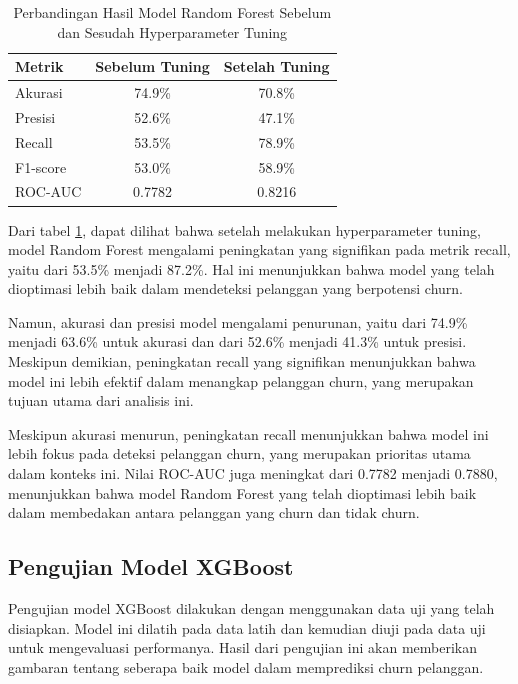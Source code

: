 \begin{table}[H]
    \centering
    \caption{Perbandingan Hasil Model Random Forest Sebelum dan Sesudah Hyperparameter Tuning}
    \label{tab:comparison_random_forest}
    \begin{tabular}{|l|c|c|}
        \hline
        \textbf{Metrik} & \textbf{Sebelum Tuning} & \textbf{Setelah Tuning} \\ \hline
        Akurasi & 74.9\% & 70.8\% \\ \hline
        Presisi & 52.6\% & 47.1\% \\ \hline
        Recall & 53.5\% & 78.9\% \\ \hline
        F1-score & 53.0\% & 58.9\% \\ \hline
        ROC-AUC & 0.7782 & 0.8216 \\ \hline
    \end{tabular}
\end{table}
Dari tabel \ref{tab:comparison_random_forest}, dapat dilihat bahwa setelah melakukan hyperparameter tuning, model Random Forest mengalami peningkatan yang signifikan pada metrik recall, yaitu dari 53.5\% menjadi 87.2\%. Hal ini menunjukkan bahwa model yang telah dioptimasi lebih baik dalam mendeteksi pelanggan yang berpotensi churn.

Namun, akurasi dan presisi model mengalami penurunan, yaitu dari 74.9\% menjadi 63.6\% untuk akurasi dan dari 52.6\% menjadi 41.3\% untuk presisi. Meskipun demikian, peningkatan recall yang signifikan menunjukkan bahwa model ini lebih efektif dalam menangkap pelanggan churn, yang merupakan tujuan utama dari analisis ini.

Meskipun akurasi menurun, peningkatan recall menunjukkan bahwa model ini lebih fokus pada deteksi pelanggan churn, yang merupakan prioritas utama dalam konteks ini. Nilai ROC-AUC juga meningkat dari 0.7782 menjadi 0.7880, menunjukkan bahwa model Random Forest yang telah dioptimasi lebih baik dalam membedakan antara pelanggan yang churn dan tidak churn.

\subsection{Pengujian Model XGBoost}
Pengujian model XGBoost dilakukan dengan menggunakan data uji yang telah disiapkan. Model ini dilatih pada data latih dan kemudian diuji pada data uji untuk mengevaluasi performanya. Hasil dari pengujian ini akan memberikan gambaran tentang seberapa baik model dalam memprediksi churn pelanggan.

